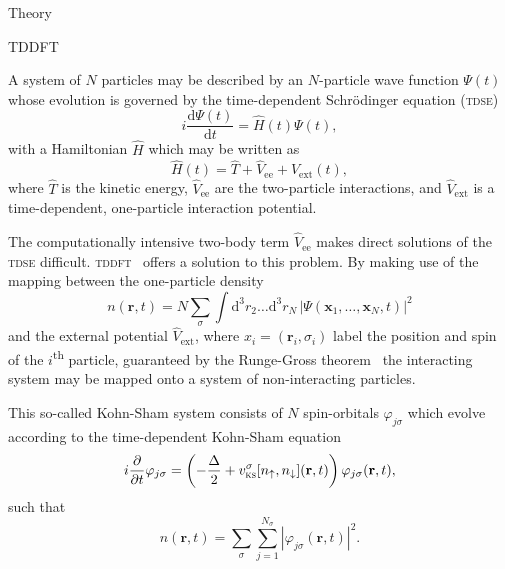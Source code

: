 \documentclass[aps, pra, reprint, groupedaddress, amsfonts, longbibliography,
               amsmath, amssymb, showpacs, nofootinbib]{revtex4-1}
\begin{document}
\begin{section}{Theory \label{sec:theory}}

   \begin{subsection}{TDDFT \label{sec:tddft}}

      A system of $N$ particles may be described by an $N$-particle wave function $\Psi(t)$ whose
      evolution is governed by the time-dependent Schr\"{o}dinger equation (\textsc{tdse})
      \begin{equation} \label{eq:tdse}
         i \frac{\mathrm{d} \Psi(t)}{\mathrm{d}t} = \hat{H}(t) \Psi(t),
      \end{equation}
      with a Hamiltonian $\hat{H}$ which may be written as
      \begin{equation} \label{eq:ham}
         \hat{H}(t) = \hat{T} + \hat{V}_\mathrm{ee} + \hat{V}_\mathrm{ext}(t),
      \end{equation}
      where $\hat{T}$ is the kinetic energy, $\hat{V}_\mathrm{ee}$ are the two-particle interactions,
      and $\hat{V}_\mathrm{ext}$ is a time-dependent, one-particle interaction potential.

      The computationally intensive two-body term $\hat{V}_\mathrm{ee}$ makes direct solutions of the
      \textsc{tdse} difficult. \textsc{tddft}~\cite{tddft, ullrich} offers a solution to this problem.
      By making use of the mapping between the one-particle density
      \begin{equation} \label{eq:dendef}
         n(\mathbf{r},t) = N \sum\limits_{\sigma} \int \mathrm{d}^3 r_2 \dots \mathrm{d}^3 r_N \,
                            \left| \Psi(\mathbf{x}_1,\dots, \mathbf{x}_N,t) \right|^2
      \end{equation}
      and the external potential $\hat{V}_\mathrm{ext}$, where $x_i = (\mathbf{r}_i, \sigma_i)$ label
      the position and spin of the $i$\textsuperscript{th} particle, guaranteed by the Runge-Gross
      theorem~\cite{rg_theorem, td-spindep} the interacting system may be mapped onto a system of
      non-interacting particles.

      This so-called Kohn-Sham system consists of $N$ spin-orbitals $\varphi_{j \sigma}$ which evolve
      according to the time-dependent Kohn-Sham equation
      \begin{equation} \label{eq:tdks}
         i \frac{\partial}{\partial t} \varphi_{j\sigma} = \left( -\frac{\Delta}{2} +
               v^\sigma_\mathrm{\textsc{ks}}[n_\uparrow, n_\downarrow](\mathbf{r},t)
               \right) \varphi_{j\sigma}(\mathbf{r},t),
      \end{equation}
      such that
      \begin{equation} \label{eq:ksden}
         n(\mathbf{r},t) = \sum\limits_\sigma \sum\limits_{j=1}^{N_\sigma}
                           \left| \varphi_{j\sigma}(\mathbf{r},t) \right|^2.
      \end{equation}
      

\end{subsection}
\end{section}
\end{document}
